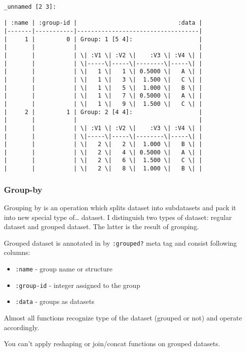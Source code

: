 \documentclass[]{article}
\providecommand{\tightlist}{%
  \setlength{\itemsep}{0pt}\setlength{\parskip}{0pt}}
\begin{document}
\begin{verbatim}
_unnamed [2 3]:

| :name | :group-id |                             :data |
|-------|-----------|-----------------------------------|
|     1 |         0 | Group: 1 [5 4]:                   |
|       |           |                                   |
|       |           | \| :V1 \| :V2 \|    :V3 \| :V4 \| |
|       |           | \|-----\|-----\|--------\|-----\| |
|       |           | \|   1 \|   1 \| 0.5000 \|   A \| |
|       |           | \|   1 \|   3 \|  1.500 \|   C \| |
|       |           | \|   1 \|   5 \|  1.000 \|   B \| |
|       |           | \|   1 \|   7 \| 0.5000 \|   A \| |
|       |           | \|   1 \|   9 \|  1.500 \|   C \| |
|     2 |         1 | Group: 2 [4 4]:                   |
|       |           |                                   |
|       |           | \| :V1 \| :V2 \|    :V3 \| :V4 \| |
|       |           | \|-----\|-----\|--------\|-----\| |
|       |           | \|   2 \|   2 \|  1.000 \|   B \| |
|       |           | \|   2 \|   4 \| 0.5000 \|   A \| |
|       |           | \|   2 \|   6 \|  1.500 \|   C \| |
|       |           | \|   2 \|   8 \|  1.000 \|   B \| |
\end{verbatim}

\subsubsection{Group-by}\label{group-by}

Grouping by is an operation which splits dataset into subdatasets and
pack it into new special type of\ldots{} dataset. I distinguish two
types of dataset: regular dataset and grouped dataset. The latter is the
result of grouping.

Grouped dataset is annotated in by \texttt{:grouped?} meta tag and
consist following columns:

\begin{itemize}
\tightlist
\item
  \texttt{:name} - group name or structure
\item
  \texttt{:group-id} - integer assigned to the group
\item
  \texttt{:data} - groups as datasets
\end{itemize}

Almost all functions recognize type of the dataset (grouped or not) and
operate accordingly.

You can't apply reshaping or join/concat functions on grouped datasets.
\end{document}
